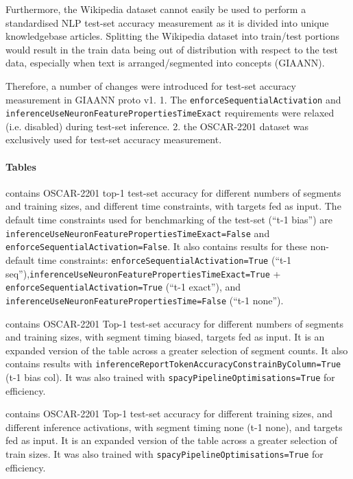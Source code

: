 Furthermore, the Wikipedia dataset cannot easily be used to perform a standardised NLP test-set accuracy measurement as it is divided into unique knowledgebase articles. Splitting the Wikipedia dataset into train/test portions would result in the train data being out of distribution with respect to the test data, especially when text is arranged/segmented into concepts (GIAANN).

Therefore, a number of changes were introduced for test-set accuracy measurement in GIAANN proto v1. 1. The \texttt{enforceSequentialActivation} and \texttt{inferenceUseNeuronFeaturePropertiesTimeExact} requirements were relaxed (i.e. disabled) during test-set inference. 2. the OSCAR-2201 dataset was exclusively used for test-set accuracy measurement.

\paragraph{Tables}

 contains OSCAR-2201 top-1 test-set accuracy for different numbers of segments and training sizes, and different time constraints, with targets fed as input. The default time constraints used for benchmarking of the test-set (``t-1 bias'') are \texttt{inferenceUseNeuronFeaturePropertiesTimeExact=False} and \texttt{enforceSequentialActivation=False}. It also contains results for these non-default time constraints: \texttt{enforceSequentialActivation=True} (``t-1 seq''),\texttt{inferenceUseNeuronFeaturePropertiesTimeExact=True} +  \texttt{enforceSequentialActivation=True} (``t-1 exact''), and \texttt{inferenceUseNeuronFeaturePropertiesTime=False} (``t-1 none'').

 contains OSCAR-2201 Top-1 test-set accuracy for different numbers of segments and training sizes, with segment timing biased, targets fed as input. It is an expanded version of the table across a greater selection of segment counts. It also contains results with \texttt{inferenceReportTokenAccuracyConstrainByColumn=True} (t-1 bias col). It was also trained with \texttt{spacyPipelineOptimisations=True} for efficiency.

 contains OSCAR-2201 Top-1 test-set accuracy for different training sizes, and different inference activations, with segment timing none (t-1 none), and targets fed as input. It is an expanded version of the table across a greater selection of train sizes. It was also trained with \texttt{spacyPipelineOptimisations=True} for efficiency.

